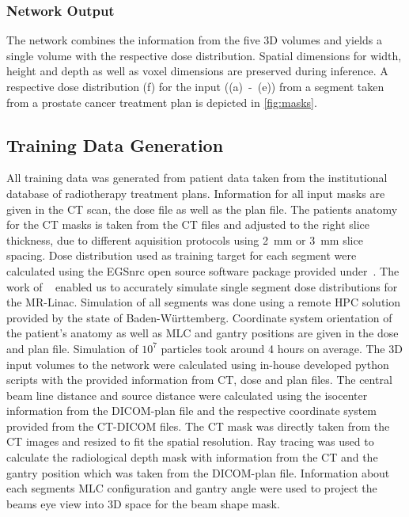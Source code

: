 \subsubsection{Network Output}

The network combines the information from the five 3D volumes and yields a single volume with the respective dose distribution. 
Spatial dimensions for width, height and depth as well as voxel dimensions are preserved during inference. 
A respective dose distribution (f) for the input ((a)~-~(e)) from a segment taken from a prostate cancer treatment plan is depicted in \autoref{fig:masks}.

\subsection{Training Data Generation}

All training data was generated from patient data taken from the institutional database of radiotherapy treatment plans. 
Information for all input masks are given in the CT scan, the dose file as well as the plan file. 
The patients anatomy for the CT masks is taken from the CT files and adjusted to the right slice thickness, due to different aquisition protocols using 2~mm or 3~mm slice spacing. 
Dose distribution used as training target for each segment were calculated using the EGSnrc open source software package provided under~\cite{noauthor_nrc-cnrcegsnrc_2021}. 
The work of \citeauthor{friedel_development_2019}~\cite{friedel_development_2019} enabled us to accurately simulate single segment dose distributions for the MR-Linac. 
Simulation of all segments was done using a remote \ac{HPC} solution provided by the state of Baden-Württemberg. 
Coordinate system orientation of the patient's anatomy as well as \ac{MLC} and gantry positions are given in the dose and plan file. 
Simulation of $10^7$ particles took around 4 hours on average.
The 3D input volumes to the network were calculated using in-house developed python scripts with the provided information from CT, dose and plan files. 
The central beam line distance and source distance were calculated using the isocenter information from the DICOM-plan file and the respective coordinate system provided from the CT-DICOM files.
The CT mask was directly taken from the CT images and resized to fit the spatial resolution. 
Ray tracing was used to calculate the radiological depth mask with information from the CT and the gantry position which was taken from the DICOM-plan file.
Information about each segments \acs{MLC} configuration and gantry angle were used to project the beams eye view into 3D space for the beam shape mask.

